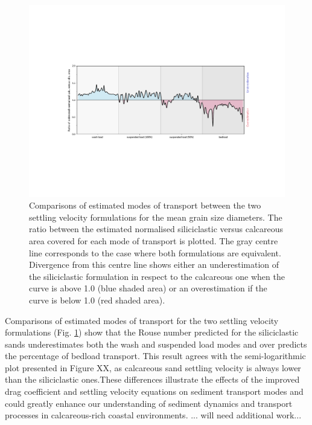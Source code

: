 \documentclass[9pt,twocolumn,twoside]{pnas-new}
\begin{document}
\begin{figure}%
\centering
\includegraphics[width=11.4cm]{fig4}
\caption{Comparisons of estimated modes of transport between the two settling velocity formulations for the mean grain size diameters. The ratio between the estimated normalised siliciclastic  versus  calcareous area covered for each mode of transport is plotted. The gray centre line corresponds to the case where both formulations are equivalent. Divergence from this centre line shows either an underestimation of the siliciclastic formulation in respect to the calcareous one when the curve is above 1.0 (blue shaded area) or an overestimation if the curve is below 1.0 (red shaded area).}
\label{fig:diff}
\end{figure}

Comparisons of estimated modes of transport for the two settling velocity formulations (Fig. \ref{fig:diff}) show that the Rouse number predicted for the siliciclastic sands underestimates both the wash and suspended load modes and over predicts the percentage of bedload transport. This result agrees with the semi-logarithmic plot presented in Figure XX, as calcareous sand settling velocity is always lower than the siliciclastic ones.These differences illustrate the effects of the improved drag coefficient and settling velocity equations on sediment transport modes and could greatly enhance our understanding of sediment dynamics and transport processes in calcareous-rich coastal environments. ... will need additional work...
\end{document}
